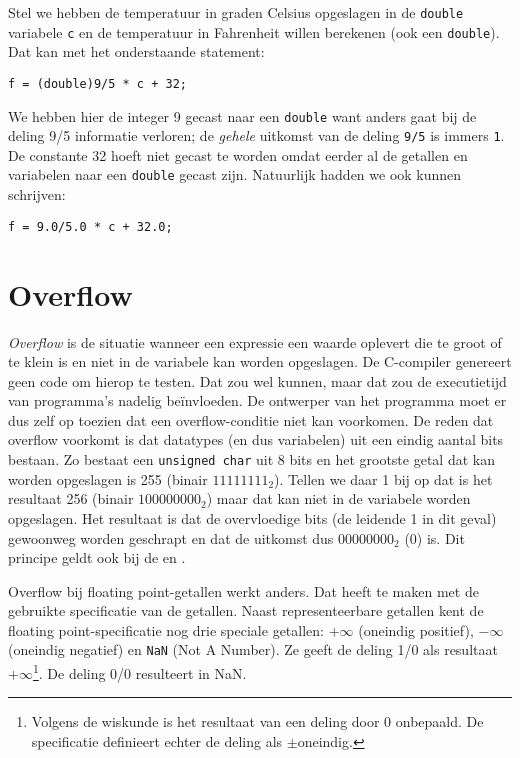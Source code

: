 Stel we hebben de temperatuur in graden Celsius opgeslagen in de \texttt{double} variabele \texttt{c} en de temperatuur in Fahrenheit willen berekenen (ook een \texttt{double}). Dat kan met het onderstaande statement:

\hspace*{1em}\texttt{f = (double)9/5 * c + 32;}

We hebben hier de integer 9 gecast naar een \texttt{double} want anders gaat bij de deling 9/5 informatie verloren; de \textsl{gehele} uitkomst van de deling \texttt{9/5} is immers \texttt{1}. De constante 32 hoeft niet gecast te worden omdat eerder al de getallen en variabelen naar een \texttt{double} gecast zijn. Natuurlijk hadden we ook kunnen schrijven:

\begin{lstlisting}[style=lstoneline]
f = 9.0/5.0 * c + 32.0;
\end{lstlisting}
 

\section{Overflow}
\textsl{Overflow} is de situatie wanneer een expressie een waarde oplevert die te groot of te klein is en niet in de variabele kan worden opgeslagen. De C-compiler genereert geen code om hierop te testen. Dat zou wel kunnen, maar dat zou de executietijd van programma's nadelig beïnvloeden. De ontwerper van het programma moet er dus zelf op toezien dat een overflow-conditie niet kan voorkomen. De reden dat overflow voorkomt is dat datatypes (en dus variabelen) uit een eindig aantal bits bestaan. Zo bestaat een \texttt{unsigned char} uit 8 bits en het grootste getal dat kan worden opgeslagen is 255 (binair $11111111_2$). Tellen we daar 1 bij op dat is het resultaat 256 (binair $100000000_2$) maar dat kan niet in de variabele worden opgeslagen. Het resultaat is dat de overvloedige bits (de leidende 1  in dit geval) gewoonweg worden geschrapt en dat de uitkomst dus $00000000_2$ (0) is. Dit principe geldt ook bij de  en .

Overflow bij floating point-getallen werkt anders. Dat heeft te maken met de gebruikte specificatie van de getallen.
Naast representeerbare getallen kent de floating point-specificatie nog drie speciale getallen: $+\infty$ (oneindig positief), $-\infty$ (oneindig negatief) en \texttt{NaN} (Not A Number). Ze geeft de deling 1/0 als resultaat $+\infty$\footnote{Volgens de wiskunde is het resultaat van een deling door 0 onbepaald. De specificatie definieert echter de deling als $\pm$oneindig.}. De deling 0/0 resulteert in NaN.


